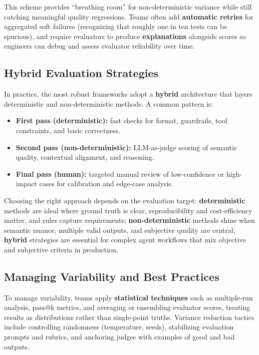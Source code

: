 \begin{TNtwocol}
This scheme provides “breathing room” for non-deterministic variance while still catching meaningful quality regressions. Teams often add \textbf{automatic retries} for aggregated soft failures (recognizing that roughly one in ten tests can be spurious), and require evaluators to produce \textbf{explanations} alongside scores so engineers can debug and assess evaluator reliability over time.

\subsection*{Hybrid Evaluation Strategies}

In practice, the most robust frameworks adopt a \textbf{hybrid} architecture that layers deterministic and non-deterministic methods. A common pattern is:
\begin{itemize}
\item \textbf{First pass (deterministic):} fast checks for format, guardrails, tool constraints, and basic correctness.
\item \textbf{Second pass (non-deterministic):} LLM-as-judge scoring of semantic quality, contextual alignment, and reasoning.
\item \textbf{Final pass (human):} targeted manual review of low-confidence or high-impact cases for calibration and edge-case analysis.
\end{itemize}

Choosing the right approach depends on the evaluation target: \textbf{deterministic} methods are ideal where ground truth is clear, reproducibility and cost-efficiency matter, and rules capture requirements; \textbf{non-deterministic} methods shine when semantic nuance, multiple valid outputs, and subjective quality are central; \textbf{hybrid} strategies are essential for complex agent workflows that mix objective and subjective criteria in production.

\subsection*{Managing Variability and Best Practices}

To manage variability, teams apply \textbf{statistical techniques} such as multiple-run analysis, pass@k metrics, and averaging or ensembling evaluator scores, treating results as distributions rather than single-point truths. Variance reduction tactics include controlling randomness (temperature, seeds), stabilizing evaluation prompts and rubrics, and anchoring judges with examples of good and bad outputs.


\end{TNtwocol}

